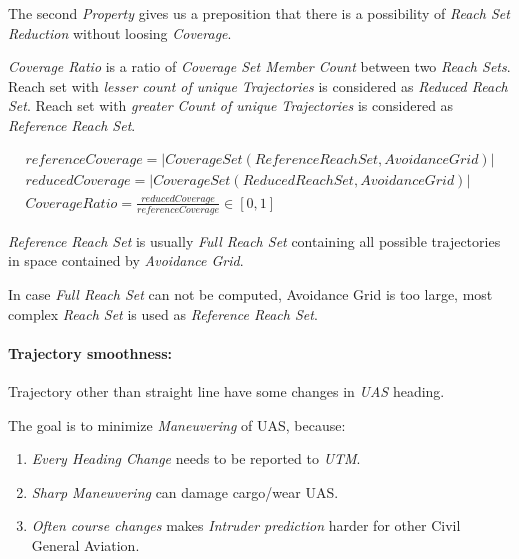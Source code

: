 The second \emph{Property} gives us a preposition that there is a possibility of \emph{Reach Set Reduction} without loosing 
\emph{Coverage}.  

\begin{definition}\label{def:coverageRatio}
    \emph{Coverage Ratio} is a ratio of \emph{Coverage Set Member Count} between two \emph{Reach Sets}. Reach set with \emph{lesser count of unique Trajectories} is considered as \emph{Reduced Reach Set}.  Reach set with \emph{greater Count of unique Trajectories} is considered as \emph{Reference Reach Set}.
    
    \begin{equation}\label{eq:CoverageRatio} 
        \begin{gathered}
            referenceCoverage=|CoverageSet(ReferenceReachSet,AvoidanceGrid)|\\
            reducedCoverage=|CoverageSet(ReducedReachSet,AvoidanceGrid)|\\
            CoverageRatio = \frac{reducedCoverage}{referenceCoverage}\in[0,1]
        \end{gathered}
    \end{equation}
\end{definition}

\begin{note}
    \emph{Reference Reach Set} is usually \emph{Full Reach Set} containing all possible trajectories in space contained by \emph{Avoidance Grid}. 
    
    In case \emph{Full Reach Set} can not be computed, Avoidance Grid is too large, most complex \emph{Reach Set} is used as \emph{Reference Reach Set}.
\end{note}

\paragraph{Trajectory smoothness:} Trajectory other than straight line have some changes in \emph{UAS} heading. 

The goal is to minimize \emph{Maneuvering} of UAS, because:
\begin{enumerate}
    \item \emph{Every Heading Change} needs to be reported to \emph{UTM}.
    \item \emph{Sharp Maneuvering} can damage cargo/wear UAS.
    \item \emph{Often course changes} makes \emph{Intruder prediction} harder for other Civil General Aviation.
\end{enumerate}

